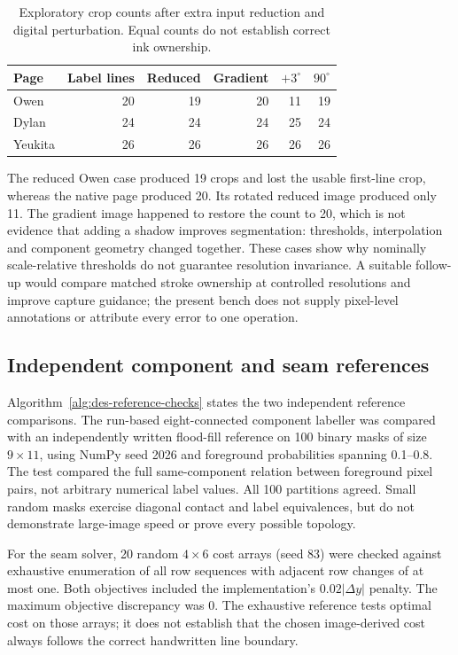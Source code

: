 \begin{table}[!htbp]\centering\small
\begin{tabular}{lrrrrr}\hline
Page & Label lines & Reduced & Gradient & $+3^\circ$ & $90^\circ$ \\\hline
Owen & 20 & 19 & 20 & 11 & 19 \\
Dylan & 24 & 24 & 24 & 25 & 24 \\
Yeukita & 26 & 26 & 26 & 26 & 26 \\
\hline\end{tabular}
\caption{Exploratory crop counts after extra input reduction and digital perturbation. Equal counts do not establish correct ink ownership.}
\label{tab:des-resample-cases}
\end{table}

The reduced Owen case produced 19 crops and lost the usable first-line crop, whereas the native page produced 20. Its rotated reduced image produced only 11. The gradient image happened to restore the count to 20, which is not evidence that adding a shadow improves segmentation: thresholds, interpolation and component geometry changed together. These cases show why nominally scale-relative thresholds do not guarantee resolution invariance. A suitable follow-up would compare matched stroke ownership at controlled resolutions and improve capture guidance; the present bench does not supply pixel-level annotations or attribute every error to one operation.


\subsection{Independent component and seam references}
Algorithm~\ref{alg:des-reference-checks} states the two independent reference comparisons.
The run-based eight-connected component labeller was compared with an independently written flood-fill reference on 100 binary masks of size $9\times11$, using NumPy seed 2026 and foreground probabilities spanning 0.1--0.8. The test compared the full same-component relation between foreground pixel pairs, not arbitrary numerical label values. All 100 partitions agreed. Small random masks exercise diagonal contact and label equivalences, but do not demonstrate large-image speed or prove every possible topology.


For the seam solver, 20 random $4\times6$ cost arrays (seed 83) were checked against exhaustive enumeration of all row sequences with adjacent row changes of at most one. Both objectives included the implementation's $0.02|\Delta y|$ penalty. The maximum objective discrepancy was $0$. The exhaustive reference tests optimal cost on those arrays; it does not establish that the chosen image-derived cost always follows the correct handwritten line boundary.


